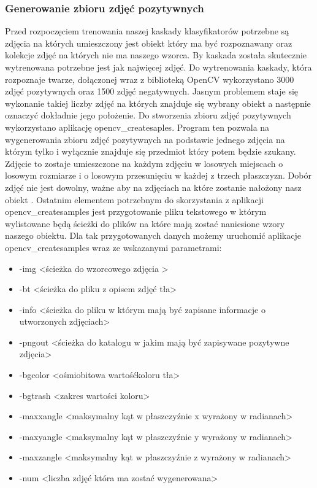 \subsubsection{Generowanie zbioru zdjęć pozytywnych}\label{sec:generowanieZdjec}
Przed rozpoczęciem trenowania naszej kaskady klasyfikatorów potrzebne są zdjęcia na których umieszczony jest  obiekt który ma być rozpoznawany oraz kolekcje zdjęć na których nie ma naszego wzorca. By kaskada została skutecznie wytrenowana potrzebne jest jak najwięcej zdjęć. Do wytrenowania kaskady, która rozpoznaje twarze, dołączonej wraz z biblioteką OpenCV wykorzystano 3000 zdjęć pozytywnych oraz 1500 zdjęć negatywnych. Jasnym problemem staje się wykonanie takiej liczby zdjęć na których znajduje się wybrany obiekt a następnie oznaczyć dokładnie jego położenie. Do stworzenia zbioru zdjęć pozytywnych wykorzystano aplikację opencv\_createsaples. Program ten pozwala na wygenerowania zbioru zdjęć pozytywnych na podstawie jednego zdjęcia na którym tylko i wyłącznie znajduje się przedmiot który potem będzie szukany. Zdjęcie to zostaje umieszczone na każdym zdjęciu w losowych miejscach o losowym rozmiarze i o losowym przesunięciu w każdej z trzech płaszczyzn. Dobór zdjęć nie jest dowolny, ważne aby na zdjęciach na które zostanie nałożony nasz obiekt . Ostatnim elementem potrzebnym do skorzystania z aplikacji opencv\_createsamples jest przygotowanie pliku tekstowego w którym wylistowane będą ścieżki do plików na które mają zostać naniesione wzory naszego obiektu. Dla tak przygotowanych danych możemy uruchomić aplikacje opencv\_createsamples wraz ze wskazanymi parametrami:
\begin{itemize}
    \item -img \textless ścieżka do wzorcowego zdjęcia \textgreater
    \item -bt \textless ścieżka do pliku z opisem zdjęć tła\textgreater
    \item -info \textless ścieżka do pliku w którym mają być zapisane informacje o utworzonych zdjęciach\textgreater
    \item -pngout \textless ścieżka do katalogu w jakim mają być zapisywane pozytywne zdjęcia\textgreater
    \item -bgcolor \textless ośmiobitowa wartośćkoloru tła\textgreater
    \item -bgtrash \textless zakres wartości koloru\textgreater
    \item -maxxangle \textless maksymalny kąt w płaszczyźnie x wyrażony w radianach\textgreater
    \item -maxyangle \textless maksymalny kąt w płaszczyźnie y wyrażony w radianach\textgreater
    \item -maxzangle \textless maksymalny kąt w płaszczyźnie z wyrażony w radianach\textgreater
    \item -num \textless liczba zdjęć która ma zostać wygenerowana>

\end{itemize}

